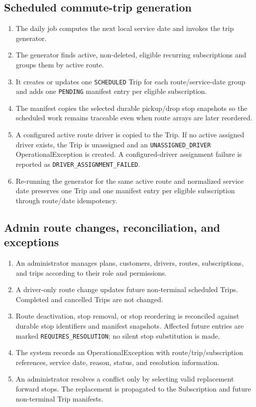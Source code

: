 \documentclass[11pt,a4paper]{article}
\newcommand{\code}[1]{\texttt{#1}}
\begin{document}
\subsection{Scheduled commute-trip generation}
\begin{enumerate}
  \item The daily job computes the next local service date and invokes the trip generator.
  \item The generator finds active, non-deleted, eligible recurring subscriptions and groups them by active route.
  \item It creates or updates one \code{SCHEDULED} Trip for each route/service-date group and adds one \code{PENDING} manifest entry per eligible subscription.
  \item The manifest copies the selected durable pickup/drop stop snapshots so the scheduled work remains traceable even when route arrays are later reordered.
  \item A configured active route driver is copied to the Trip. If no active assigned driver exists, the Trip is unassigned and an \code{UNASSIGNED\_DRIVER} OperationalException is created. A configured-driver assignment failure is reported as \code{DRIVER\_ASSIGNMENT\_FAILED}.
  \item Re-running the generator for the same active route and normalized service date preserves one Trip and one manifest entry per eligible subscription through route/date idempotency.
\end{enumerate}

\subsection{Admin route changes, reconciliation, and exceptions}
\begin{enumerate}
  \item An administrator manages plans, customers, drivers, routes, subscriptions, and trips according to their role and permissions.
  \item A driver-only route change updates future non-terminal scheduled Trips. Completed and cancelled Trips are not changed.
  \item Route deactivation, stop removal, or stop reordering is reconciled against durable stop identifiers and manifest snapshots. Affected future entries are marked \code{REQUIRES\_RESOLUTION}; no silent stop substitution is made.
  \item The system records an OperationalException with route/trip/subscription references, service date, reason, status, and resolution information.
  \item An administrator resolves a conflict only by selecting valid replacement forward stops. The replacement is propagated to the Subscription and future non-terminal Trip manifests.
\end{enumerate}
\end{document}
